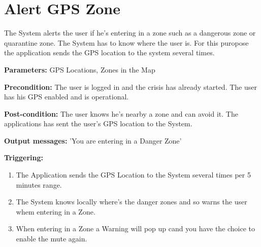 \section{Alert GPS Zone}
\label{operation:AlertGPSZone}
The System alerts the user if he's entering in a zone such as a dangerous zone
or quarantine zone. The System has to know where the user is. For this
puropose the application sends the GPS location to the system several times.\\
\begin{description}
\item \textbf{Parameters:} GPS Locations, Zones in the Map 
\item \textbf{Precondition:} The user is logged in and the
crisis has already started. The user has his GPS enabled and is operational.
\item \textbf{Post-condition:} The user knows he's nearby a zone and can avoid
it. The applications has sent the user's GPS location to the System.
\item \textbf{Output messages:} 'You are entering in a Danger Zone'
\item \textbf{Triggering:}
\begin{enumerate}
\item The Application sends the GPS Location to the System several times per 5
minutes range.
\item The System knows locally where's the danger zones and so warns the user
whem entering in a Zone.
\item When entering in a Zone a Warning will pop up cand you have the choice to
enable the mute again.
\end{enumerate}
\end{description}   

